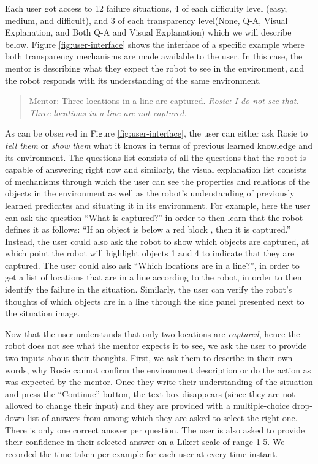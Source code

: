 \documentclass[letterpaper]{article}
\begin{document}
Each user got access to 12 failure situations, 4 of each difficulty level (easy, medium, and difficult), and 3 of each transparency level(None, Q-A, Visual Explanation, and Both Q-A and Visual Explanation) which we will describe below. Figure \ref{fig:user-interface} shows the interface of a specific example where both transparency mechanisms are made available to the user. In this case, the mentor is describing what they expect the robot to see in the environment, and the robot responds with its understanding of the same environment.
\begin{quote}
Mentor: Three locations in a line are captured.
\textit{Rosie: I do not see that. Three locations in a line are not captured.}
\end{quote}

As can be observed in Figure \ref{fig:user-interface}, the user can either ask Rosie to \emph{tell them} or \emph{show them} what it knows in terms of previous learned knowledge and its environment. The questions list consists of all the questions that the robot is capable of answering right now and similarly, the visual explanation list consists of mechanisms through which the user can see the properties and relations of the objects in the environment as well as the robot's understanding of previously learned predicates and situating it in its environment. For example, here the user can ask the question ``What is captured?'' in order to then learn that the robot defines it as follows: ``If an object is below a red block , then it is captured.'' Instead, the user could also ask the robot to show which objects are captured, at which point the robot will highlight objects 1 and 4 to indicate that they are captured. The user could also ask ``Which locations are in a line?'', in order to get a list of locations that are in a line according to the robot, in order to then identify the failure in the situation. Similarly, the user can verify the robot's thoughts of which objects are in a line through the side panel presented next to the situation image. 

Now that the user understands that only two locations are \emph{captured}, hence the robot does not see what the mentor expects it to see, we ask the user to provide two inputs about their thoughts. First, we ask them to describe in their own words, why Rosie cannot confirm the environment description or do the action as was expected by the mentor. Once they write their understanding of the situation and press the ``Continue'' button, the text box disappears (since they are not allowed to change their input) and they are provided with a multiple-choice drop-down list of answers from among which they are asked to select the right one. There is only one correct answer per question. The user is also asked to provide their confidence in their selected answer on a Likert scale of range 1-5. We recorded the time taken per example for each user at every time instant.
\end{document}
